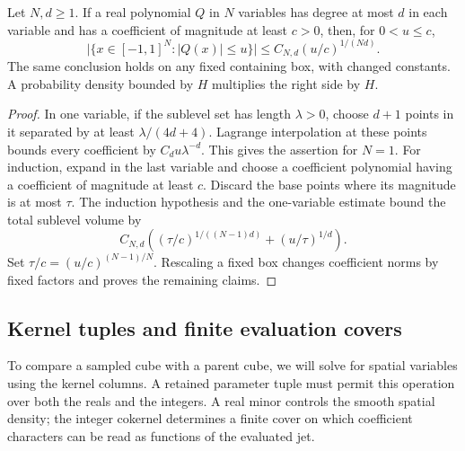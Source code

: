 \begin{lemma}
\label{cube:polynomial-sublevel}
Let $N,d\ge1$.  If a real polynomial $Q$ in $N$ variables has degree
at most $d$ in each variable and has a coefficient of magnitude at
least $c>0$, then, for $0<u\le c$,
\[
 \big|\{x\in[-1,1]^N:|Q(x)|\le u\}\big|
 \le C_{N,d}(u/c)^{1/(Nd)}.
\]
The same conclusion holds on any fixed containing box, with changed
constants.  A probability density bounded by $H$ multiplies the
right side by $H$.
\end{lemma}
\begin{proof}
In one variable, if the sublevel set has length $\lambda>0$, choose
$d+1$ points in it separated by at least $\lambda/(4d+4)$.
Lagrange interpolation at these points bounds every coefficient by
$C_d u\lambda^{-d}$.  This gives the assertion for $N=1$.
For induction, expand in the last variable and choose a coefficient
polynomial having a coefficient of magnitude at least $c$.
Discard the base points where its magnitude is at most $\tau$.
The induction hypothesis and the one-variable estimate bound the
total sublevel volume by
\[
 C_{N,d}\left((\tau/c)^{1/((N-1)d)}+(u/\tau)^{1/d}\right).
\]
Set $\tau/c=(u/c)^{(N-1)/N}$.  Rescaling a fixed box changes
coefficient norms by fixed factors and proves the remaining claims.
\end{proof}

\subsection{Kernel tuples and finite evaluation covers}

To compare a sampled cube with a parent cube, we will solve for
spatial variables using the kernel columns. A retained parameter
tuple must permit this operation over both the reals and the
integers. A real minor controls the smooth spatial density; the
integer cokernel determines a finite cover on which coefficient
characters can be read as functions of the evaluated jet.

